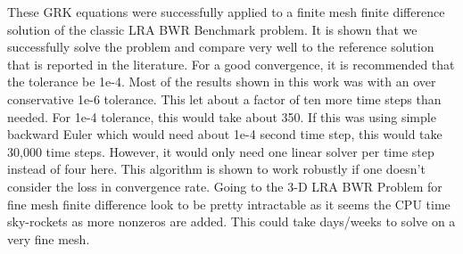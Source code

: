 \documentclass{ansconf}
\numberwithin{equation}{section}
\begin{document}
These GRK equations were successfully applied to a finite mesh finite difference solution of the classic LRA BWR Benchmark problem.  It is shown that we successfully solve the problem and compare very well to the reference solution that is reported in the literature. For a good convergence, it is recommended that the tolerance be 1e-4. Most of the results shown in this work was with an over conservative 1e-6 tolerance. This let about a factor of ten more time steps than needed. For 1e-4 tolerance, this would take about 350. If this was using simple backward Euler which would need about 1e-4 second time step, this would take 30,000 time steps. However, it would only need one linear solver per time step instead of four here. This algorithm is shown to work robustly if one doesn't consider the loss in convergence rate. Going to the 3-D LRA BWR Problem for fine mesh finite difference look to be pretty intractable as it seems the CPU time sky-rockets as more nonzeros are added. This could take days/weeks to solve on a very fine mesh.

\setlength{\baselineskip}{12pt}




\pagebreak
\newpage

\appendix
\end{document}
